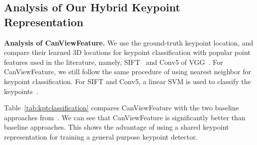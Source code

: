\documentclass[runningheads]{llncs}
\begin{document}
\subsection{Analysis of Our Hybrid Keypoint Representation}
\label{Subsection:Advanced:Analysis}
\begin{table}[t]
\center
{}
\caption{Results for keypoint classification  on Pascal3D+ Dataset~\cite{xiang2014beyond}. We show keypoint classification accuracy of each category.}
\label{tab:kptclassification}
\end{table}

\noindent\textbf{Analysis of CanViewFeature.} 
We use the ground-truth keypoint location, and compare their learned 3D locations for keypoint classification with popular point features used in the literature, namely, SIFT~\cite{lowe2004distinctive} and Conv5 
of VGG~\cite{simonyan2014very}.
For CanViewFeature, we still follow the same procedure of using nearest neighbor for keypoint classification. 
For SIFT and Conv5, a linear SVM is used to classify the keypoints~\cite{long2014convnets}. 

Table~\ref{tab:kptclassification} compares CanViewFeature with the two baseline approaches from~\cite{long2014convnets}. We can see that CanViewFeature is significantly better than baseline approaches. This shows the advantage of using a shared keypoint representation for training a general purpose keypoint detector. 
\end{document}
